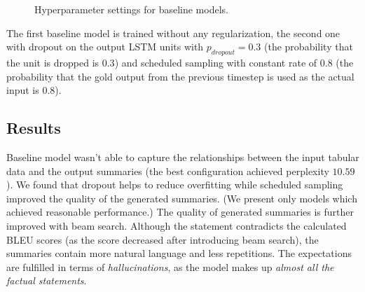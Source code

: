 \begin{figure}[h]
    \caption{Hyperparameter settings for baseline models.} \label{figure:hyperparameters_baseline}
\end{figure}

The first baseline model is trained without any regularization, the second one with dropout on the output LSTM units with $p_{dropout} = 0.3$ (the probability that the unit is dropped is $0.3$) and scheduled sampling with constant rate of $0.8$ (the probability that the gold output from the previous timestep is used as the actual input is $0.8$).

\subsection{Results}

Baseline model wasn't able to capture the relationships between the input tabular data and the output summaries (the best configuration achieved perplexity $10.59$). We found that dropout helps to reduce overfitting while scheduled sampling improved the quality of the generated summaries. (We present only models which achieved reasonable performance.) The quality of generated summaries is further improved with beam search. Although the statement contradicts the calculated BLEU scores (as the score decreased after introducing beam search), the summaries contain more natural language and less repetitions. The expectations are fulfilled in terms of \emph{hallucinations}, as the model makes up \emph{almost all the factual statements}.

